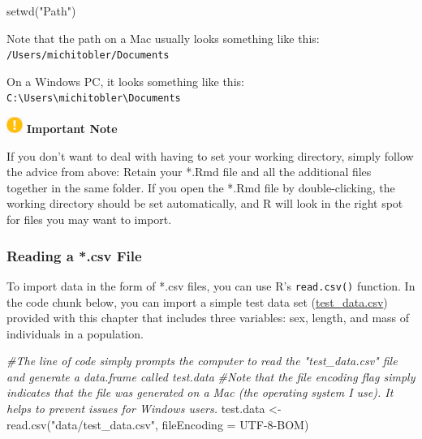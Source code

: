 \documentclass[
]{book}
\newenvironment{Shaded}{\begin{snugshade}}{\end{snugshade}}
\newcommand{\AttributeTok}[1]{\textcolor[rgb]{0.77,0.63,0.00}{#1}}
\newcommand{\CommentTok}[1]{\textcolor[rgb]{0.56,0.35,0.01}{\textit{#1}}}
\newcommand{\FunctionTok}[1]{\textcolor[rgb]{0.00,0.00,0.00}{#1}}
\newcommand{\NormalTok}[1]{#1}
\newcommand{\OtherTok}[1]{\textcolor[rgb]{0.56,0.35,0.01}{#1}}
\newcommand{\StringTok}[1]{\textcolor[rgb]{0.31,0.60,0.02}{#1}}
\begin{document}
\begin{Shaded}
\begin{Highlighting}[]
\NormalTok{setwd(}\StringTok{"Path"}\NormalTok{)}
\end{Highlighting}
\end{Shaded}

Note that the path on a Mac usually looks something like this: \texttt{/Users/michitobler/Documents}

On a Windows PC, it looks something like this: \texttt{C:\textbackslash{}Users\textbackslash{}michitobler\textbackslash{}Documents}

\includegraphics[width=0.20833in,height=\textheight]{images/important.png} \textbf{Important Note}

If you don't want to deal with having to set your working directory, simply follow the advice from above: Retain your *.Rmd file and all the additional files together in the same folder. If you open the *.Rmd file by double-clicking, the working directory should be set automatically, and R will look in the right spot for files you may want to import.

\hypertarget{reading-a-.csv-file}{%
\subsubsection*{Reading a *.csv File}\label{reading-a-.csv-file}}

To import data in the form of *.csv files, you can use R's \texttt{read.csv()} function. In the code chunk below, you can import a simple test data set (\href{data/test_data.csv}{test\_data.csv}) provided with this chapter that includes three variables: sex, length, and mass of individuals in a population.

\begin{Shaded}
\begin{Highlighting}[]
\CommentTok{\#The line of code simply prompts the computer to read the "test\_data.csv" file and generate a data.frame called test.data}
\CommentTok{\#Note that the file encoding flag simply indicates that the file was generated on a Mac (the operating system I use). It helps to prevent issues for Windows users.}
\NormalTok{test.data }\OtherTok{\textless{}{-}} \FunctionTok{read.csv}\NormalTok{(}\StringTok{"data/test\_data.csv"}\NormalTok{, }\AttributeTok{fileEncoding =} \StringTok{\textquotesingle{}UTF{-}8{-}BOM\textquotesingle{}}\NormalTok{)}
\end{Highlighting}
\end{Shaded}
\end{document}
